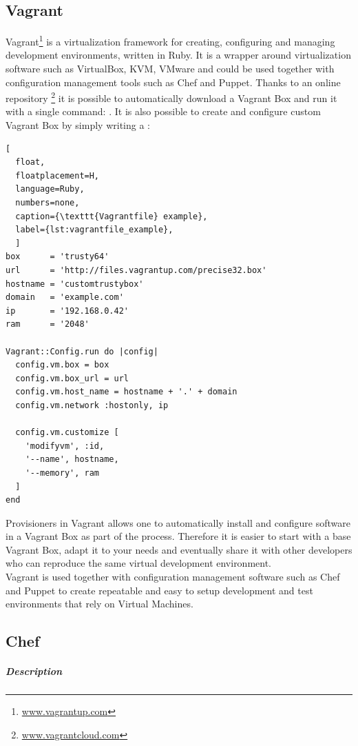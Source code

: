 \subsection{Vagrant}
\label{sub:sota_vagrant}
Vagrant\footnote{\url{www.vagrantup.com}} is a virtualization framework for creating, configuring and managing development environments, written in Ruby. It is a wrapper around virtualization software such as VirtualBox, KVM, VMware and could be used together with configuration management tools such as Chef and Puppet.
Thanks to an online repository \footnote{\url{www.vagrantcloud.com}} it is possible to automatically download a Vagrant Box and run it with a single command: .
It is also possible to create and configure custom Vagrant Box by simply writing a :
\begin{lstlisting}[
  float,
  floatplacement=H,
  language=Ruby,
  numbers=none,
  caption={\texttt{Vagrantfile} example},
  label={lst:vagrantfile_example},
  ]
box      = 'trusty64'
url      = 'http://files.vagrantup.com/precise32.box'
hostname = 'customtrustybox'
domain   = 'example.com'
ip       = '192.168.0.42'
ram      = '2048'

Vagrant::Config.run do |config|
  config.vm.box = box
  config.vm.box_url = url
  config.vm.host_name = hostname + '.' + domain
  config.vm.network :hostonly, ip

  config.vm.customize [
    'modifyvm', :id,
    '--name', hostname,
    '--memory', ram
  ]
end
\end{lstlisting}
Provisioners in Vagrant allows one to automatically install and configure software in a Vagrant Box as part of the  process. Therefore it is easier to start with a base Vagrant Box, adapt it to your needs and eventually share it with other developers who can reproduce the same virtual development environment.\\
Vagrant is used together with configuration management software such as Chef and Puppet to create repeatable and easy to setup development and test environments that rely on Virtual Machines.



\subsection{Chef}
\label{sub:sota_chef}

\subparagraph{Description}
\label{subp:sota_chef_desc}

